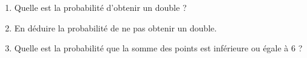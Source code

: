 \begin{exo}
\begin{center}
	\end{center}
	\begin{enumerate}
		\item Quelle est la probabilité d'obtenir un double ?
		\item En déduire la probabilité de ne pas obtenir un double.
		\item Quelle est la probabilité que la somme des points est inférieure ou égale à $6$ ?
	\end{enumerate}
\end{exo}
